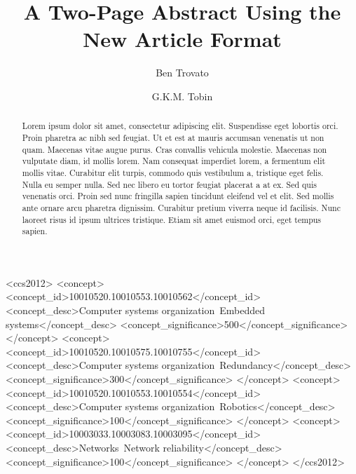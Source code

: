 \documentclass[sigconf,authorversion]{acmart}
\begin{document}
\title{A Two-Page Abstract Using the New Article Format}

\author{Ben Trovato}

\author{G.K.M. Tobin}

\renewcommand{\shortauthors}{B. Trovato et. al.}

\begin{abstract}

Lorem ipsum dolor sit amet, consectetur adipiscing elit. Suspendisse eget lobortis orci. Proin pharetra ac nibh sed feugiat. Ut et est at mauris accumsan venenatis ut non quam. Maecenas vitae augue purus. Cras convallis vehicula molestie. Maecenas non vulputate diam, id mollis lorem. Nam consequat imperdiet lorem, a fermentum elit mollis vitae. Curabitur elit turpis, commodo quis vestibulum a, tristique eget felis. Nulla eu semper nulla. Sed nec libero eu tortor feugiat placerat a at ex. Sed quis venenatis orci. Proin sed nunc fringilla sapien tincidunt eleifend vel et elit. Sed mollis ante ornare arcu pharetra dignissim. Curabitur pretium viverra neque id facilisis. Nunc laoreet risus id ipsum ultrices tristique. Etiam sit amet euismod orci, eget tempus sapien.

\end{abstract}

%
%
\begin{CCSXML}
<ccs2012>
 <concept>
  <concept_id>10010520.10010553.10010562</concept_id>
  <concept_desc>Computer systems organization~Embedded systems</concept_desc>
  <concept_significance>500</concept_significance>
 </concept>
 <concept>
  <concept_id>10010520.10010575.10010755</concept_id>
  <concept_desc>Computer systems organization~Redundancy</concept_desc>
  <concept_significance>300</concept_significance>
 </concept>
 <concept>
  <concept_id>10010520.10010553.10010554</concept_id>
  <concept_desc>Computer systems organization~Robotics</concept_desc>
  <concept_significance>100</concept_significance>
 </concept>
 <concept>
  <concept_id>10003033.10003083.10003095</concept_id>
  <concept_desc>Networks~Network reliability</concept_desc>
  <concept_significance>100</concept_significance>
 </concept>
</ccs2012>  
\end{CCSXML}
\end{document}
